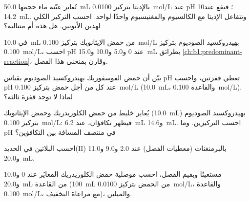 \begin{exercise}[$\star$]\label{exo:b1:titration-methods:4}
تُعاير عيّنة ماء حجمها \qty{50.0}{mL} بالإديتا بتركيز
\qty{0.0100}{mol/L} عند pH 10؛ فيقع  عند \qty{14.2}{mL}. وتتفاعل
الإديتا مع الكالسيوم والمغنيسيوم واحدًا لواحد. احسب التركيز الكلي
لهذين الأيونين. هل هذه  أم
متتالية؟
\end{exercise}

\begin{exercise}[$\star\star$]\label{exo:b1:titration-methods:5}
في  \qty{10.0}{mL} من حمض الإيثانويك بتركيز \qty{0.100}{mol/L}
بهيدروكسيد الصوديوم بتركيز \qty{0.100}{mol/L}، احسب pH عند 0 و5.0 و10.0
و\qty{15.0}{mL} بطرائق \cref{ch:b1:predominant-reaction}،
وقارن بمنحنى هذا الفصل.
\end{exercise}

\begin{exercise}[$\star\star$]\label{exo:b1:titration-methods:6}
بيّن أن  حمض الفوسفوريك بهيدروكسيد الصوديوم بقياس pH
تعطي قفزتين، واحسب pH عند كل  من أجل حمض بتركيز
\qty{0.100}{mol/L} (\qty{10.0}{mL}، والقاعدة \qty{0.100}{mol/L}). لماذا لا توجد
قفزة ثالثة؟
\end{exercise}

\begin{exercise}[$\star\star$]\label{exo:b1:titration-methods:7}
يُعاير خليط من حمض الكلوريدريك وحمض الإيثانويك (\qty{10.0}{mL})
بهيدروكسيد الصوديوم بتركيز \qty{0.100}{mol/L}: فيظهر تكافؤان، عند
\qty{6.2}{mL} و\qty{14.6}{mL}. احسب التركيزين. وما
pH في منتصف المسافة بين التكافؤين؟
\end{exercise}

\begin{exercise}[$\star\star$]\label{exo:b1:titration-methods:8}
احسب  البلاتين في 
الحديد(II) بالبرمنغنات (معطيات الفصل) عند 2.0 و9.0 و11.0
و\qty{20.0}{mL}.
\end{exercise}

\begin{exercise}[$\star\star$]\label{exo:b1:titration-methods:9}
مستعينًا  وبقيم الفصل، احسب
موصلية حمض الكلوريدريك المعايَر عند 0 و10.0
و\qty{20.0}{mL} من القاعدة (\qty{100}{mL} من الحمض بتركيز \qty{0.0100}{mol/L}، والقاعدة
\qty{0.100}{mol/L}، مع مراعاة التخفيف)، والميلين.
\end{exercise}

